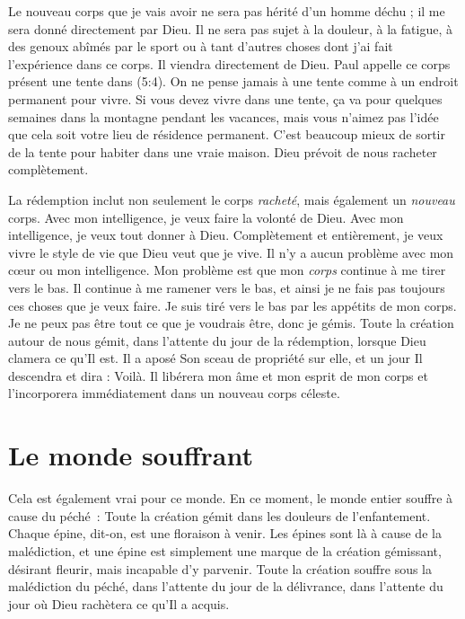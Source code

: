 Le nouveau corps que je vais avoir ne sera pas hérité d'un homme déchu ;
 il me sera donné directement par Dieu.
 Il ne sera pas sujet à la douleur, à la fatigue, à des genoux abîmés
 par le sport ou à tant d'autres choses dont j'ai fait l'expérience
 dans ce corps. Il viendra directement de Dieu.
 Paul appelle ce corps présent une \og tente \fg{} dans (5:4).
 On ne pense jamais à une tente comme à un endroit permanent pour vivre.
 Si vous devez vivre dans une tente, ça va pour quelques semaines
 dans la montagne pendant les vacances, mais vous n'aimez pas l'idée
 que cela soit votre lieu de résidence permanent.
 C'est beaucoup mieux de sortir de la tente pour habiter dans une vraie maison.
 Dieu prévoit de nous racheter complètement.

La rédemption inclut non seulement le corps \emph{racheté}, mais également
 un \emph{nouveau} corps. Avec mon intelligence, je veux faire la volonté de Dieu.
 Avec mon intelligence, je veux tout donner à Dieu.
 Complètement et entièrement, je veux vivre le style de vie que Dieu
 veut que je vive. Il n'y a aucun problème avec mon cœur ou mon intelligence.
 Mon problème est que mon \emph{corps} continue à me tirer vers le bas.
 Il continue à me ramener vers le bas, et ainsi je ne fais pas toujours
 ces choses que je veux faire. Je suis tiré vers le bas par les appétits
 de mon corps. Je ne peux pas être tout ce que je voudrais être,
 donc je gémis. Toute la création autour de nous gémit,
 dans l'attente du jour de la rédemption, lorsque Dieu clamera ce qu'Il est.
 Il a aposé Son sceau de propriété sur elle, et un jour Il descendra
 et dira : \og Voilà. \fg{}
 Il libérera mon âme et mon esprit de mon corps et l'incorporera
 immédiatement dans un nouveau corps céleste.


\section*{Le monde souffrant}

Cela est également vrai pour ce monde.
 En ce moment, le monde entier souffre à cause du péché~:
 \og Toute la création gémit dans les douleurs de l'enfantement. \fg{}
 Chaque épine, dit-on, est une floraison à venir.
 Les épines sont là à cause de la malédiction, et une épine est simplement
 une marque de la création gémissant, désirant fleurir, mais incapable
 d'y parvenir. Toute la création souffre sous la malédiction du péché,
 dans l'attente du jour de la délivrance, dans l'attente du jour
 où Dieu rachètera ce qu'Il a acquis.

